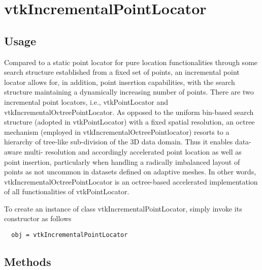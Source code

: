 \section{vtkIncrementalPointLocator}

\subsection{Usage}

  Compared to a static point locator for pure location functionalities 
  through some search structure established from a fixed set of points,
  an incremental point locator allows for, in addition, point insertion
  capabilities, with the search structure maintaining a dynamically
  increasing number of points. There are two incremental point locators,
  i.e., vtkPointLocator and vtkIncrementalOctreePointLocator. As opposed
  to the uniform bin-based search structure (adopted in vtkPointLocator)
  with a fixed spatial resolution, an octree mechanism (employed in
  vtkIncrementalOctreePointlocator) resorts to a hierarchy of tree-like
  sub-division of the 3D data domain. Thus it enables data-aware multi-
  resolution and accordingly accelerated point location as well as point
  insertion, particularly when handling a radically imbalanced layout of
  points as not uncommon in datasets defined on adaptive meshes. In other
  words, vtkIncrementalOctreePointLocator is an octree-based accelerated
  implementation of all functionalities of vtkPointLocator. 
  

To create an instance of class vtkIncrementalPointLocator, simply
invoke its constructor as follows
\begin{verbatim}
  obj = vtkIncrementalPointLocator
\end{verbatim}
\subsection{Methods}

